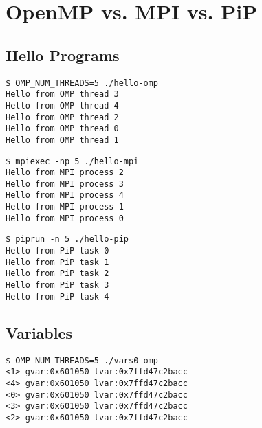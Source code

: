 
\chapter{OpenMP vs. MPI vs. PiP}

\section{Hello Programs}


\begin{lstlisting}[style=example,caption={``Hello OMP'' output},label=out:hello-omp]
$ OMP_NUM_THREADS=5 ./hello-omp
Hello from OMP thread 3
Hello from OMP thread 4
Hello from OMP thread 2
Hello from OMP thread 0
Hello from OMP thread 1
\end{lstlisting}


\begin{lstlisting}[style=example,caption={``Hello MPI'' output},label=out:hello-mpi]
$ mpiexec -np 5 ./hello-mpi
Hello from MPI process 2
Hello from MPI process 3
Hello from MPI process 4
Hello from MPI process 1
Hello from MPI process 0
\end{lstlisting}


\begin{lstlisting}[style=example,caption={``Hello PiP'' output},label=out:hello-pip]
$ piprun -n 5 ./hello-pip
Hello from PiP task 0
Hello from PiP task 1
Hello from PiP task 2
Hello from PiP task 3
Hello from PiP task 4
\end{lstlisting}

\section{Variables}



\begin{lstlisting}[style=example,caption={``Vars0 OMP'' output},label=out:vars0-omp]
$ OMP_NUM_THREADS=5 ./vars0-omp
<1> gvar:0x601050 lvar:0x7ffd47c2bacc
<4> gvar:0x601050 lvar:0x7ffd47c2bacc
<0> gvar:0x601050 lvar:0x7ffd47c2bacc
<3> gvar:0x601050 lvar:0x7ffd47c2bacc
<2> gvar:0x601050 lvar:0x7ffd47c2bacc
\end{lstlisting}

